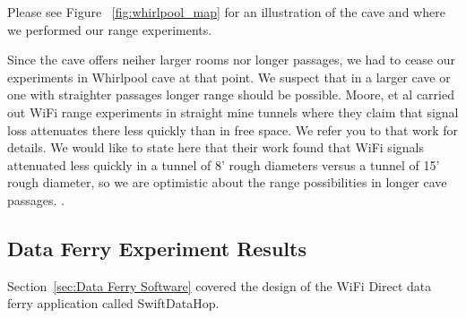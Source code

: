 \documentclass[10pt,twocolumn]{article}
\begin{document}
Please see Figure ~\ref{fig:whirlpool_map} for an illustration of the cave and where we performed our range experiments.

Since the cave offers neiher larger rooms nor longer passages, we had to cease our experiments in Whirlpool cave at that point.
We suspect that in a larger cave or one with straighter passages longer range should be possible.
Moore, et al carried out WiFi range experiments in straight mine tunnels where they claim that signal loss attenuates there less quickly than in free space.
We refer you to that work for details.
We would like to state here that their work found that WiFi signals attenuated less quickly in a tunnel of 8' rough diameters versus a tunnel of 15' rough diameter, so we are optimistic about the range possibilities in longer cave passages. \cite{moore2012}.

\subsection{Data Ferry Experiment Results}
\label{sec:Data Ferry Experiment Results}
Section~\ref{sec:Data Ferry Software} covered the design of the WiFi Direct data ferry application called SwiftDataHop. 
\end{document}
